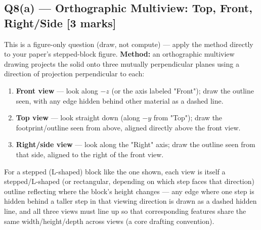 \documentclass[12pt, a4paper]{article}
\newenvironment{answerbox}{\begin{mdframed}[style=answerframe]}{\end{mdframed}}
\begin{document}
\subsection*{Q8(a) --- Orthographic Multiview: Top, Front, Right/Side [3 marks]}
\begin{answerbox}
This is a figure-only question (draw, not compute) --- apply the method directly to your paper's stepped-block figure. \textbf{Method:} an orthographic multiview drawing projects the solid onto three mutually perpendicular planes using a direction of projection perpendicular to each:
\begin{enumerate}[noitemsep]
  \item \textbf{Front view} --- look along $-z$ (or the axis labeled "Front"); draw the outline seen, with any edge hidden behind other material as a dashed line.
  \item \textbf{Top view} --- look straight down (along $-y$ from "Top"); draw the footprint/outline seen from above, aligned directly above the front view.
  \item \textbf{Right/side view} --- look along the "Right" axis; draw the outline seen from that side, aligned to the right of the front view.
\end{enumerate}
For a stepped (L-shaped) block like the one shown, each view is itself a stepped/L-shaped (or rectangular, depending on which step faces that direction) outline reflecting where the block's height changes --- any edge where one step is hidden behind a taller step in that viewing direction is drawn as a dashed hidden line, and all three views must line up so that corresponding features share the same width/height/depth across views (a core drafting convention).
\end{answerbox}

\end{document}
